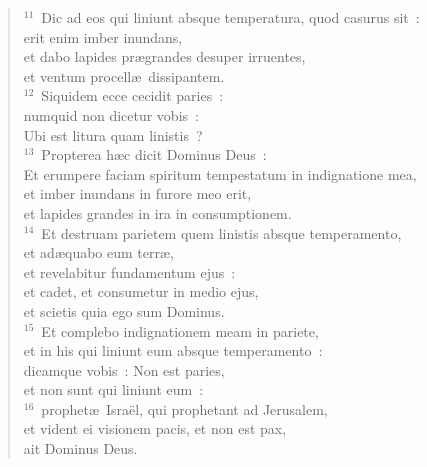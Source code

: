 \begin{verse}
${}^{11}$~Dic ad eos qui liniunt absque temperatura, quod casurus sit~:\\ erit enim imber inundans,\\ et dabo lapides pr\ae grandes desuper irruentes,\\ et ventum procell\ae\ dissipantem.\\
${}^{12}$~Siquidem ecce cecidit paries~:\\ numquid non dicetur vobis~:\\ Ubi est litura quam linistis~?\\
${}^{13}$~Propterea h\ae c dicit Dominus Deus~:\\ Et erumpere faciam spiritum tempestatum in indignatione mea,\\ et imber inundans in furore meo erit,\\ et lapides grandes in ira in consumptionem.\\
${}^{14}$~Et destruam parietem quem linistis absque temperamento,\\ et ad\ae quabo eum terr\ae ,\\ et revelabitur fundamentum ejus~:\\ et cadet, et consumetur in medio ejus,\\ et scietis quia ego sum Dominus.\\
${}^{15}$~Et complebo indignationem meam in pariete,\\ et in his qui liniunt eum absque temperamento~:\\ dicamque vobis~: Non est paries,\\ et non sunt qui liniunt eum~:\\
${}^{16}$~prophet\ae\ Isra\"el, qui prophetant ad Jerusalem,\\ et vident ei visionem pacis, et non est pax,\\ ait Dominus Deus.\end{verse}


